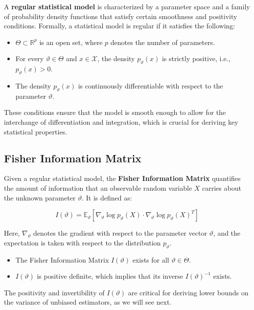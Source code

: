 \documentclass[open=any, 11pt,paper=A4]{scrreprt}
\begin{document}
A \textbf{regular statistical model} is characterized by a parameter space and a family of probability density functions that satisfy certain smoothness and positivity conditions. Formally, a statistical model is regular if it satisfies the following:

\begin{itemize}
    \item \(\Theta \subset \mathbb{R}^p\) is an open set, where \(p\) denotes the number of parameters.
    \item For every \(\vartheta \in \Theta\) and \(x \in \mathcal{X}\), the density \(p_\vartheta(x)\) is strictly positive, i.e., \(p_\vartheta(x) > 0\).
    \item The density \(p_\vartheta(x)\) is continuously differentiable with respect to the parameter \(\vartheta\).
\end{itemize}

These conditions ensure that the model is smooth enough to allow for the interchange of differentiation and integration, which is crucial for deriving key statistical properties.

\subsection*{Fisher Information Matrix}

Given a regular statistical model, the \textbf{Fisher Information Matrix} quantifies the amount of information that an observable random variable \(X\) carries about the unknown parameter \(\vartheta\). It is defined as:

\[
I(\vartheta) = \mathbb{E}_\vartheta \left[ \nabla_\vartheta \log p_\vartheta(X) \cdot \nabla_\vartheta \log p_\vartheta(X)^T \right]
\]

Here, \(\nabla_\vartheta\) denotes the gradient with respect to the parameter vector \(\vartheta\), and the expectation is taken with respect to the distribution \(p_\vartheta\).

\begin{itemize}
    \item The Fisher Information Matrix \(I(\vartheta)\) exists for all \(\vartheta \in \Theta\).
    \item \(I(\vartheta)\) is positive definite, which implies that its inverse \(I(\vartheta)^{-1}\) exists.
\end{itemize}

The positivity and invertibility of \(I(\vartheta)\) are critical for deriving lower bounds on the variance of unbiased estimators, as we will see next.
\end{document}
